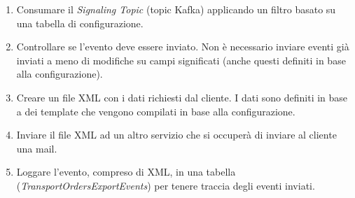 \begin{enumerate}
    \item Consumare il \textit{Signaling Topic} (topic Kafka) applicando un filtro basato su una tabella di configurazione.
    \item Controllare se l'evento deve essere inviato. Non è necessario inviare eventi già inviati a meno di modifiche su campi significati 
    (anche questi definiti in base alla configurazione).
    \item Creare un file XML con i dati richiesti dal cliente. I dati sono definiti in base a dei template che vengono compilati in base alla configurazione.
    \item Inviare il file XML ad un altro servizio che si occuperà di inviare al cliente una mail.
    \item Loggare l'evento, compreso di XML, in una tabella (\textit{TransportOrdersExportEvents}) per tenere traccia degli eventi inviati.
\end{enumerate}

